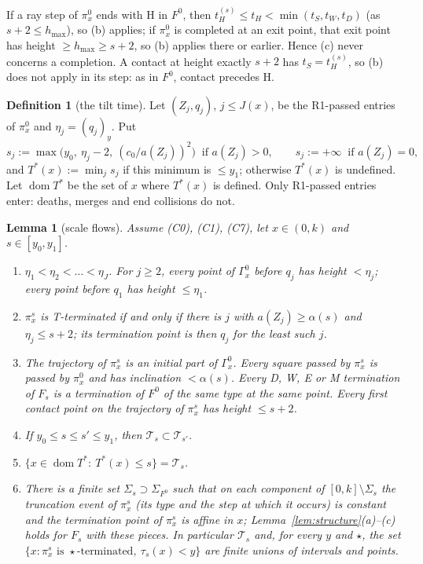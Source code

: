 \documentclass[11pt]{amsart}
\newcommand{\hmax}{h_{\max}}
\newcommand{\Fz}{F^{0}}
\newcommand{\Fs}{F_{s}}
\newcommand{\Tstar}{T^{*}}
\newtheorem{lemma}[theorem]{Lemma}
\theoremstyle{definition}
\newtheorem{definition}[theorem]{Definition}
\theoremstyle{remark}
\numberwithin{equation}{section}
\begin{document}
If a ray step of $\pi^0_x$ ends with H in $\Fz$, then $t^{(s)}_H\le t_H<\min(t_S,t_W,t_D)$ (as $s+2\le\hmax$), so (b)
applies; if $\pi^0_x$ is completed at an exit point, that exit point has height $\ge\hmax\ge s+2$, so (b) applies there
or earlier. Hence (c) never concerns a completion. A contact at height exactly $s+2$ has $t_S=t^{(s)}_H$, so (b) does not
apply in its step: as in $\Fz$, contact precedes H.

\begin{definition}[the tilt time]\label{def:flows-Tstar}
Let $(Z_j,q_j)$, $j\le J(x)$, be the R1-passed entries of $\pi^0_x$ and $\eta_j=(q_j)_y$. Put
\[
s_j:=\max\big(y_0,\ \eta_j-2,\ (c_0/a(Z_j))^2\big)\ \text{ if }a(Z_j)>0,\qquad s_j:=+\infty\ \text{ if }a(Z_j)=0,
\]
and $\Tstar(x):=\min_js_j$ if this minimum is $\le y_1$; otherwise $\Tstar(x)$ is undefined. Let $\operatorname{dom}\Tstar$
be the set of $x$ where $\Tstar(x)$ is defined. Only R1-passed entries enter: deaths, merges and end collisions do not.
\end{definition}

\begin{lemma}[scale flows]\label{lem:flows-Ts}
Assume \textup{(C0)}, \textup{(C1)}, \textup{(C7)}, let $x\in(0,k)$ and $s\in[y_0,y_1]$.
\begin{enumerate}[label=(\alph*)]
\item $\eta_1<\eta_2<\dots<\eta_J$. For $j\ge2$, every point of $\Gamma^0_x$ before $q_j$ has height $<\eta_j$; every point
before $q_1$ has height $\le\eta_1$.
\item $\pi^s_x$ is T-terminated if and only if there is $j$ with $a(Z_j)\ge\alpha(s)$ and $\eta_j\le s+2$; its termination
point is then $q_j$ for the least such $j$.
\item The trajectory of $\pi^s_x$ is an initial part of $\Gamma^0_x$. Every square passed by $\pi^s_x$ is passed by
$\pi^0_x$ and has inclination $<\alpha(s)$. Every D, W, E or M termination of $\Fs$ is a termination of $\Fz$ of the
same type at the same point. Every first contact point on the trajectory of $\pi^s_x$ has height $\le s+2$.
\item If $y_0\le s\le s'\le y_1$, then $\mathcal T_s\subset\mathcal T_{s'}$.
\item $\{x\in\operatorname{dom}\Tstar:\ \Tstar(x)\le s\}=\mathcal T_s$.
\item There is a finite set $\Sigma_s\supset\Sigma_{\Fz}$ such that on each component of $[0,k]\setminus\Sigma_s$ the
truncation event of $\pi^s_x$ (its type and the step at which it occurs) is constant and the termination point of
$\pi^s_x$ is affine in $x$; Lemma~\ref{lem:structure}(a)--(c) holds for $\Fs$ with these pieces. In particular
$\mathcal T_s$ and, for every $y$ and $\star$, the set $\{x:\pi^s_x\text{ is }\star\text{-terminated},\ \tau_s(x)<y\}$ are finite
unions of intervals and points.
\end{enumerate}
\end{lemma}
\end{document}
